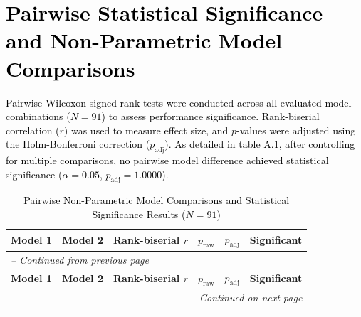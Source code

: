 \documentclass[a4paper,fleqn]{cas-sc}
\begin{document}
{\begin{longtable}{p{2cm} p{7.75cm} p{3cm} p{2.25cm}}
\end{longtable}

\newpage

\section{\textcolor{black}{Pairwise Statistical Significance and Non-Parametric Model Comparisons}}
\label{app:pairwise_statistical}
\textcolor{black}{Pairwise Wilcoxon signed-rank tests were conducted across all evaluated model combinations ($N = 91$) to assess performance significance. Rank-biserial correlation ($r$) was used to measure effect size, and $p$-values were adjusted using the Holm-Bonferroni correction ($p_{\text{adj}}$). As detailed in table A.1, after controlling for multiple comparisons, no pairwise model difference achieved statistical significance ($\alpha = 0.05$, $p_{\text{adj}} = 1.0000$).}
\begingroup
\captionsetup[longtable]{justification=raggedright, singlelinecheck=false}
\small

\begin{longtable}{l l c c c c}
\caption{\textcolor{black}{Pairwise Non-Parametric Model Comparisons and Statistical Significance Results ($N = 91$)}} 
\label{tab:app_statistical_comparisons} \\
\toprule
\textbf{Model 1} & \textbf{Model 2} & \textbf{Rank-biserial $r$} & \textbf{$p_{\text{raw}}$} & \textbf{$p_{\text{adj}}$} & \textbf{Significant} \\ 
\midrule
\endfirsthead

\multicolumn{6}{l}{\textit{-- Continued from previous page}} \\
\toprule
\textbf{Model 1} & \textbf{Model 2} & \textbf{Rank-biserial $r$} & \textbf{$p_{\text{raw}}$} & \textbf{$p_{\text{adj}}$} & \textbf{Significant} \\ 
\midrule
\endhead

\midrule
\multicolumn{6}{r}{\textit{Continued on next page}} \\
\endfoot

\bottomrule
\endlastfoot


\end{longtable}}
\end{document}
